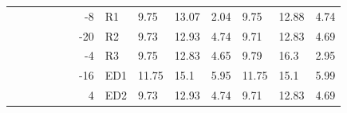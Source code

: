 {\begin{minipage}{\linewidth}
\begin{tabular}{l|l|l|l|c|c|r|l|lll|lll}
                                              &                                          &                                           &                                           &                                            &                                                                                         & -8                                                                                             & R1                                        & 9.75  & 13.07 & 2.04      & 9.75  & 12.88 & 4.74       \\
                                              &                                          &                                           &                                           &                                            &                                                                                         & -20                                                                                            & R2                                        & 9.73  & 12.93 & 4.74      & 9.71  & 12.83 & 4.69       \\
                                              &                                          &                                           &                                           &                                            &                                                                                         & -4                                                                                             & R3                                        & 9.75  & 12.83 & 4.65      & 9.79  & 16.3  & 2.95       \\
                                              &                                          &                                           &                                           &                                            &                                                                                         & -16                                                                                            & ED1                                       & 11.75 & 15.1  & 5.95      & 11.75 & 15.1  & 5.99       \\
                                              &                                          &                                           &                                           &                                            &                                                                                         & 4                                                                                              & ED2                                       & 9.73  & 12.93 & 4.74      & 9.71  & 12.83 & 4.69       \\

\end{tabular}
\end{minipage}}

